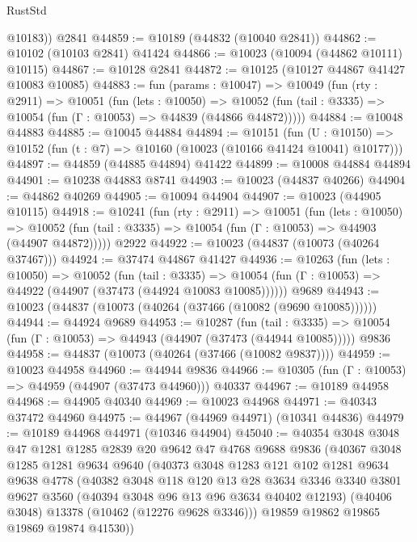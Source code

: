 \begin{lexlean}{RustStd}
\begin{coremodule}
        @10183))
    @2841
@44859 := @10189 (@44832 (@10040 @2841))
@44862 := @10102 (@10103 @2841) @41424
@44866 := @10023 (@10094 (@44862 @10111) @10115)
@44867 := @10128 @2841
@44872 := @10125 (@10127 @44867 @41427 @10083 @10085)
@44883 := fun (params : @10047) =>
  @10049
    (fun (rty : @2911) =>
    @10051
      (fun (lets : @10050) =>
      @10052 (fun (tail : @3335) => @10054 (fun (Γ : @10053) => @44839 (@44866 @44872)))))
@44884 := @10048 @44883
@44885 := @10045 @44884
@44894 := @10151
    (fun (U : @10150) => @10152 (fun (t : @7) => @10160 (@10023 (@10166 @41424 @10041) @10177)))
@44897 := @44859 (@44885 @44894) @41422
@44899 := @10008 @44884 @44894
@44901 := @10238 @44883 @8741
@44903 := @10023 (@44837 @40266)
@44904 := @44862 @40269
@44905 := @10094 @44904
@44907 := @10023 (@44905 @10115)
@44918 := @10241
    (fun (rty : @2911) =>
    @10051
      (fun (lets : @10050) =>
      @10052 (fun (tail : @3335) => @10054 (fun (Γ : @10053) => @44903 (@44907 @44872)))))
    @2922
@44922 := @10023 (@44837 (@10073 (@40264 @37467)))
@44924 := @37474 @44867 @41427
@44936 := @10263
    (fun (lets : @10050) =>
    @10052
      (fun (tail : @3335) =>
      @10054 (fun (Γ : @10053) => @44922 (@44907 (@37473 (@44924 @10083 @10085))))))
    @9689
@44943 := @10023 (@44837 (@10073 (@40264 (@37466 (@10082 (@9690 @10085))))))
@44944 := @44924 @9689
@44953 := @10287
    (fun (tail : @3335) => @10054 (fun (Γ : @10053) => @44943 (@44907 (@37473 (@44944 @10085)))))
    @9836
@44958 := @44837 (@10073 (@40264 (@37466 (@10082 @9837))))
@44959 := @10023 @44958
@44960 := @44944 @9836
@44966 := @10305 (fun (Γ : @10053) => @44959 (@44907 (@37473 @44960))) @40337
@44967 := @10189 @44958
@44968 := @44905 @40340
@44969 := @10023 @44968
@44971 := @40343 @37472 @44960
@44975 := @44967 (@44969 @44971) (@10341 @44836)
@44979 := @10189 @44968 @44971 (@10346 @44904)
@45040 := @40354
    @3048
    @3048
    @47
    @1281
    @1285
    @2839
    @20
    @9642
    @47
    @4768
    @9688
    @9836
    (@40367
      @3048
      @1285
      @1281
      @9634
      @9640
      (@40373
        @3048
        @1283
        @121
        @102
        @1281
        @9634
        @9638
        @4778
        (@40382
          @3048
          @118
          @120
          @13
          @28
          @3634
          @3346
          @3340
          @3801
          @9627
          @3560
          (@40394 @3048 @96 @13 @96 @3634 @40402 @12193)
          (@40406 @3048)
          @13378
          (@10462 (@12276 @9628 @3346)))
        @19859
        @19862
        @19865
        @19869
        @19874
        @41530))

\end{coremodule}
\end{lexlean}
